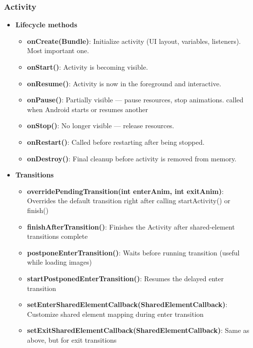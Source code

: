 \documentclass{report}
\begin{document}
    \subsubsection{Activity}
    \begin{itemize}
        \item \textbf{Lifecycle methods}
            \begin{itemize}
                \item \textbf{onCreate(Bundle)}:	Initialize activity (UI layout, variables, listeners). Most important one.
                \item \textbf{onStart()}:	Activity is becoming visible.
                \item \textbf{onResume()}:	Activity is now in the foreground and interactive.
                \item \textbf{onPause()}:	Partially visible — pause resources, stop animations. called when Android starts or resumes another
                \item \textbf{onStop()}:	No longer visible — release resources.
                \item \textbf{onRestart()}:	Called before restarting after being stopped.
                \item \textbf{onDestroy()}:	Final cleanup before activity is removed from memory.
            \end{itemize}
        \item \textbf{Transitions}
            \begin{itemize}
                \item \textbf{overridePendingTransition(int enterAnim, int exitAnim)}:	Overrides the default transition right after calling startActivity() or finish()
                \item \textbf{finishAfterTransition()}: 	Finishes the Activity after shared-element transitions complete
                \item \textbf{postponeEnterTransition()}: 	Waits before running transition (useful while loading images)
                \item \textbf{startPostponedEnterTransition()}: 	Resumes the delayed enter transition
                \item \textbf{setEnterSharedElementCallback(SharedElementCallback)}: 	Customize shared element mapping during enter transition
                \item \textbf{setExitSharedElementCallback(SharedElementCallback)}: 	Same as above, but for exit transitions

\end{itemize}
\end{itemize}
\end{document}
